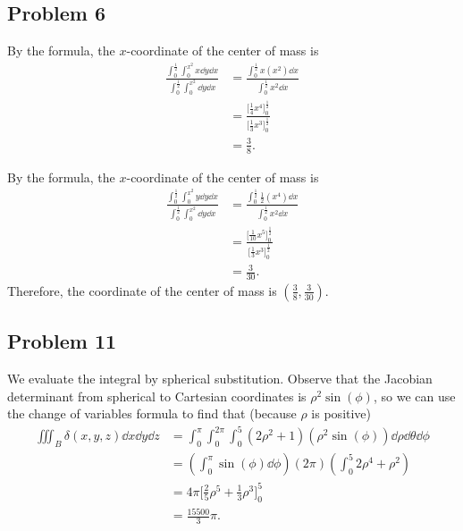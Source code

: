 \documentclass[11pt]{article}
\begin{document}

\subsection*{Problem 6}

By the formula, the $x$-coordinate of the center of mass is
\begin{align*}
	\frac{\int_{0}^{\tfrac{1}{2}} \int_{0}^{x^{2}} x \dd{y} \dd{x}}{\int_{0}^{\tfrac{1}{2}} \int_{0}^{x^{2}} \dd{y} \dd{x}} &= \frac{\int_{0}^{\tfrac{1}{2}} x (x^{2}) \dd{x}}{\int_{0}^{\tfrac{1}{2}} x^{2} \dd{x}} \\
	&= \frac{\Big[ \tfrac{1}{4} x^{4} \Big]_{0}^{\tfrac{1}{2}}}{\Big[ \tfrac{1}{3} x^{3} \Big]_{0}^{\tfrac{1}{2}}} \\
	&= \frac{3}{8}.
\end{align*}

By the formula, the $x$-coordinate of the center of mass is
\begin{align*}
	\frac{\int_{0}^{\tfrac{1}{2}} \int_{0}^{x^{2}} y \dd{y} \dd{x}}{\int_{0}^{\tfrac{1}{2}} \int_{0}^{x^{2}} \dd{y} \dd{x}} &= \frac{\int_{0}^{\tfrac{1}{2}} \tfrac{1}{2} (x^{4}) \dd{x}}{\int_{0}^{\tfrac{1}{2}} x^{2} \dd{x}} \\ 
	&= \frac{\Big[ \tfrac{1}{10} x^{5} \Big]_{0}^{\tfrac{1}{2}}}{\Big[ \tfrac{1}{3} x^{3} \Big]_{0}^{\tfrac{1}{2}}} \\
	&= \frac{3}{30}.
\end{align*}
Therefore, the coordinate of the center of mass is $\boxed{\left( \frac{3}{8}, \frac{3}{30} \right)}$.


\subsection*{Problem 11}

We evaluate the integral by spherical substitution. Observe that the Jacobian determinant from spherical to Cartesian coordinates is $\rho^{2} \sin(\phi)$, so we can use the change of variables formula to find that (because $\rho$ is positive)
\begin{align*}
	\iiint_{B} \delta(x, y, z) \dd{x} \dd{y} \dd{z} &= \int_{0}^{\pi} \int_{0}^{2\pi} \int_{0}^{5} (2\rho^{2} + 1) (\rho^{2} \sin(\phi)) \dd{\rho} \dd{\theta} \dd{\phi} \\
	&= \left( \int_{0}^{\pi} \sin(\phi) \dd{\phi} \right) (2\pi) \left( \int_{0}^{5} 2\rho^{4} + \rho^{2} \right) \\
	&= 4\pi \Big[ \tfrac{2}{5} \rho^{5} + \tfrac{1}{3} \rho^{3} \Big]_{0}^{5} \\
	&= \boxed{\frac{15500}{3} \pi}.
\end{align*}
\end{document}
